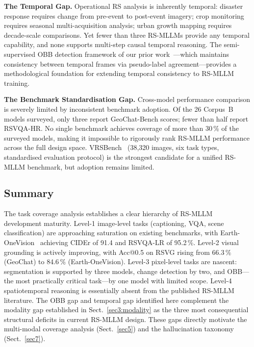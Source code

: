 \textbf{The Temporal Gap.} Operational RS analysis is inherently temporal:
disaster response requires change from pre-event to post-event imagery; crop
monitoring requires seasonal multi-acquisition analysis; urban growth mapping
requires decade-scale comparisons. Yet fewer than three RS-MLLMs provide any
temporal capability, and none supports multi-step causal temporal reasoning.
The semi-supervised OBB detection framework of our prior
work~\cite{sm2lf2026}---which maintains consistency between temporal frames via
pseudo-label agreement---provides a methodological foundation for extending
temporal consistency to RS-MLLM training.

\textbf{The Benchmark Standardisation Gap.} Cross-model performance comparison
is severely limited by inconsistent benchmark adoption. Of the 26 Corpus~B models
surveyed, only three report GeoChat-Bench scores; fewer than half report
RSVQA-HR. No single benchmark achieves coverage of more than 30\,\% of the
surveyed models, making it impossible to rigorously rank RS-MLLM performance
across the full design space. VRSBench~\cite{vrsbench2024} (38,320 images,
six task types, standardised evaluation protocol) is the strongest candidate
for a unified RS-MLLM benchmark, but adoption remains limited.

\subsection*{Summary}

The task coverage analysis establishes a clear hierarchy of RS-MLLM development
maturity. Level-1 image-level tasks (captioning, VQA, scene classification) are
approaching saturation on existing benchmarks, with Earth-OneVision~\cite{earthonevision2026}
achieving CIDEr of 91.4 and RSVQA-LR of 95.2\,\%. Level-2 visual grounding is
actively improving, with Acc@0.5 on RSVG rising from 66.3\,\% (GeoChat) to 84.6\,\%
(Earth-OneVision). Level-3 pixel-level tasks are nascent: segmentation is supported
by three models, change detection by two, and OBB---the most practically
critical task---by one model with limited scope. Level-4 spatiotemporal
reasoning is essentially absent from the published RS-MLLM literature. The OBB
gap and temporal gap identified here complement the modality gap established in
Sect.~\ref{sec3:modality} as the three most consequential structural deficits
in current RS-MLLM design. These gaps directly motivate the multi-modal coverage
analysis (Sect.~\ref{sec5}) and the hallucination taxonomy (Sect.~\ref{sec7}).
